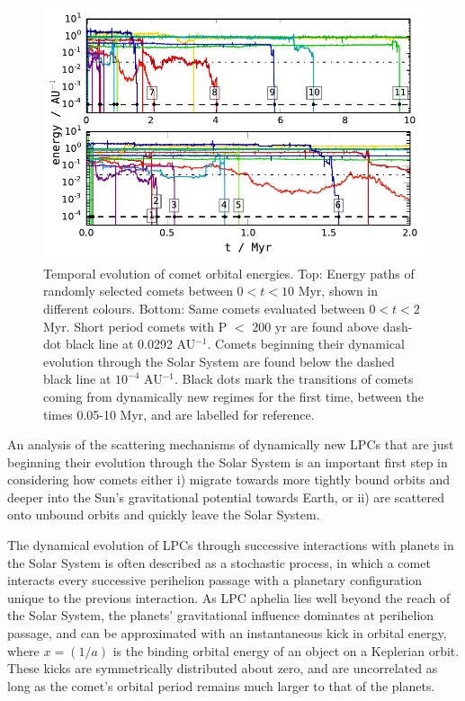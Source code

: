 \begin{figure}[t!]
    \centering
    \includegraphics{figures/ae_timeplot.pdf}
    \caption[Random walks in energy space]{Temporal evolution of comet orbital energies. Top: Energy paths of randomly selected comets between $0<t<10$ Myr, shown in different colours. Bottom: Same comets evaluated between $0<t<2$ Myr. Short period comets with P $<$ 200 yr are found above dash-dot black line at 0.0292 AU$^{-1}$.  Comets beginning their dynamical evolution through the Solar System are found below the dashed black line at $10^{-4}$ AU$^{-1}$. Black dots mark the transitions of comets coming from dynamically new regimes for the first time, between the times 0.05-10 Myr, and are labelled for reference.}
    \label{fig:timeplot}
\end{figure}

An analysis of the scattering mechanisms of dynamically new LPCs that are just beginning their evolution through the Solar System is an important first step in considering how comets  either i) migrate towards more tightly bound orbits and deeper into the Sun's gravitational potential towards Earth, or ii) are scattered onto unbound orbits and quickly leave the Solar System.

The dynamical evolution of LPCs through successive interactions with planets in the Solar System is often described as a stochastic process, in which a comet interacts every successive perihelion passage with a planetary configuration unique to the previous interaction. As LPC aphelia lies well beyond the reach of the Solar System, the planets' gravitational influence dominates at perihelion passage, and can be approximated with an instantaneous kick in orbital energy, where $x = (1/a)$ is the binding orbital energy of an object on a Keplerian orbit. These kicks are symmetrically distributed about zero, and are uncorrelated as long as the comet's orbital period remains much larger to that of the planets. 


